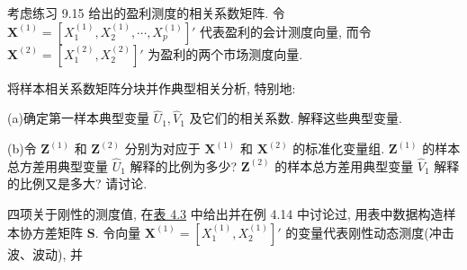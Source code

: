 \quad 考虑练习 9.15 给出的盈利测度的相关系数矩阵. 令 $\mathbf{X}^{(1)}=[X_1^{(1)},X_2^{(1)},\cdots,X_p^{(1)}]'$ 代表盈利的会计测度向量, 而令 $\mathbf{X}^{(2)}=[X_1^{(2)},X_2^{(2)}]'$ 为盈利的两个市场测度向量.

将样本相关系数矩阵分块并作典型相关分析, 特别地:

\noindent (a)\quad 确定第一样本典型变量 $\hat{U}_1,\hat{V}_1$ 及它们的相关系数. 解释这些典型变量.

\noindent (b)\quad 令 $\mathbf{Z}^{(1)}$ 和 $\mathbf{Z}^{(2)}$ 分别为对应于 $\mathbf{X}^{(1)}$ 和 $\mathbf{X}^{(2)}$ 的标准化变量组. $\mathbf{Z}^{(1)}$ 的样本总方差用典型变量 $\hat{U}_1$ 解释的比例为多少? $\mathbf{Z}^{(2)}$ 的样本总方差用典型变量 $\hat{V}_1$ 解释的比例又是多大? 请讨论.

\quad 四项关于刚性的测度值, 在\hyperref[tab:4.3]{表 4.3} 中给出并在例 4.14 中讨论过, 用表中数据构造样本协方差矩阵 $\mathbf{S}$. 令向量 $\mathbf{X}^{(1)}=[X_1^{(1)},X_2^{(1)}]'$ 的变量代表刚性动态测度(冲击波、波动), 并
